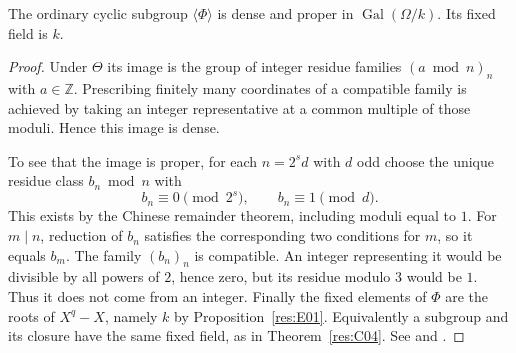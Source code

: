 \begin{proposition}\label{res:E07}
The ordinary cyclic subgroup \(\langle\Phi\rangle\) is dense and
proper in \(\operatorname{Gal}(\Omega/k)\). Its fixed field is \(k\).
\end{proposition}
\begin{proof}
Under \(\Theta\) its image is the group of integer residue families
\((a\bmod n)_n\) with \(a\in\mathbb Z\). Prescribing finitely many
coordinates of a compatible family is achieved by taking an integer
representative at a common multiple of those moduli. Hence this image
is dense.

To see that the image is proper, for each \(n=2^s d\) with \(d\) odd
choose the unique residue class \(b_n\bmod n\) with
\[
                      b_n\equiv0\pmod{2^s},
                \qquad b_n\equiv1\pmod d .
\]
This exists by the Chinese remainder theorem, including moduli
equal to \(1\). For \(m\mid n\), reduction of \(b_n\) satisfies the
corresponding two conditions for \(m\), so it equals \(b_m\).
The family \((b_n)_n\) is compatible. An integer representing it
would be divisible by all powers of \(2\), hence zero, but its
residue modulo \(3\) would be \(1\). Thus it does not come from
an integer. Finally the fixed elements of \(\Phi\) are the roots
of \(X^q-X\), namely \(k\) by Proposition~\ref{res:E01}.
Equivalently a subgroup and its closure have the same fixed field,
as in Theorem~\ref{res:C04}. See \cite[Example 7.17]{milne}
and \cite[Exercise 2.11.4]{rz}.
\end{proof}

